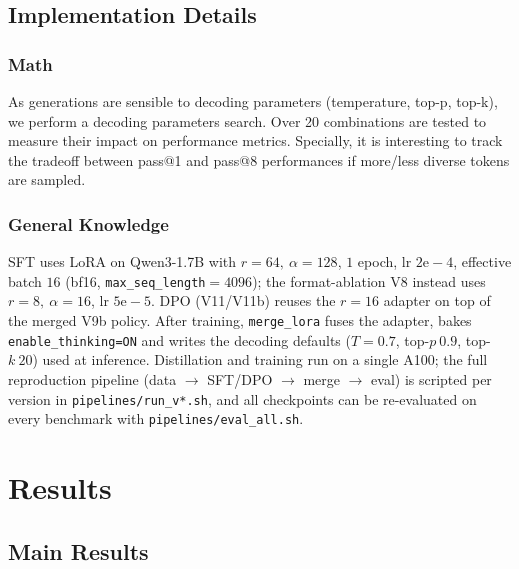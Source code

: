 \documentclass[11pt]{article}
\begin{document}
\subsection{Implementation Details}

\subsubsection{Math}

    As generations are sensible to decoding parameters (temperature, top-p, top-k), we perform a decoding parameters search. Over 20 combinations are tested to measure their impact on performance metrics. Specially, it is interesting to track the tradeoff between pass@1 and pass@8 performances if more/less diverse tokens are sampled.

\subsubsection{General Knowledge}

    SFT uses LoRA on Qwen3-1.7B with $r{=}64,\ \alpha{=}128$, $1$ epoch, lr $2\mathrm{e}{-}4$, effective batch $16$ (bf16, \texttt{max\_seq\_length}$=4096$); the format-ablation V8 instead uses $r{=}8,\ \alpha{=}16$, lr $5\mathrm{e}{-}5$. DPO (V11/V11b) reuses the $r{=}16$ adapter on top of the merged V9b policy. After training, \texttt{merge\_lora} fuses the adapter, bakes \texttt{enable\_thinking=ON} and writes the decoding defaults ($T{=}0.7$, top-$p\ 0.9$, top-$k\ 20$) used at inference. Distillation and training run on a single A100; the full reproduction pipeline (data $\rightarrow$ SFT/DPO $\rightarrow$ merge $\rightarrow$ eval) is scripted per version in \texttt{pipelines/run\_v*.sh}, and all checkpoints can be re-evaluated on every benchmark with \texttt{pipelines/eval\_all.sh}.

\section{Results}

\subsection{Main Results}
\end{document}
